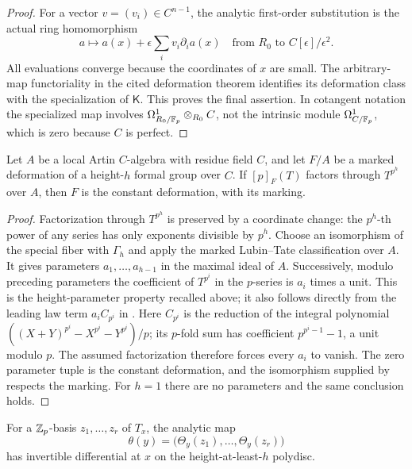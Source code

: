 \begin{proof}
For a vector $v=(v_i)\in C^{n-1}$, the analytic first-order substitution
is the actual ring homomorphism
\[
 a\longmapsto a(x)+\epsilon\sum_i v_i\partial_i a(x)
       \quad\text{from }R_0\text{ to }C[\epsilon]/\epsilon^2.
\]
All evaluations converge because the coordinates of $x$ are small.
The arbitrary-map functoriality in the cited deformation theorem
identifies its deformation class with the specialization of $\mathsf K$.
This proves the final assertion.  In cotangent notation the specialized
map involves $\Omega^1_{R_0/\mathbb F_p}\otimes_{R_0}C$, not the intrinsic module
$\Omega^1_{C/\mathbb F_p}$, which is zero because $C$ is perfect.
\end{proof}

\begin{lemma}\label{def:height-rigidity}
Let $A$ be a local Artin $C$-algebra with residue field $C$, and let $F/A$
be a marked deformation of a height-$h$ formal group over $C$.
If $[p]_F(T)$ factors through $T^{p^h}$ over $A$, then $F$ is the constant
deformation, with its marking.
\end{lemma}

\begin{proof}
Factorization through $T^{p^h}$ is preserved by a coordinate change:
the $p^h$-th power of any series has only exponents divisible by $p^h$.
Choose an isomorphism of the special fiber with $\Gamma_h$ and apply the
marked Lubin--Tate classification over $A$.  It gives parameters
$a_1,\ldots,a_{h-1}$ in the maximal ideal of $A$.
Successively, modulo preceding parameters the coefficient of $T^{p^i}$
in the $p$-series is $a_i$ times a unit.  This is the height-parameter
property recalled above; it also follows directly from the leading law
term $a_i C_{p^i}$ in \cite[Proposition~1.1]{LT66}.  Here $C_{p^i}$ is the
reduction of the integral polynomial
$((X+Y)^{p^i}-X^{p^i}-Y^{p^i})/p$; its $p$-fold sum has coefficient
$p^{p^i-1}-1$, a unit modulo $p$.
The assumed factorization therefore forces every $a_i$ to vanish.
The zero parameter tuple is the constant deformation, and the
isomorphism supplied by \cite[Theorem~3.1]{LT66} respects the marking.
For $h=1$ there are no parameters and the same conclusion holds.
\end{proof}

\begin{proposition}\label{def:coordinates}
For a $\mathbb Z_p$-basis $z_1,\ldots,z_r$ of $T_x$, the analytic map
\begin{equation}
 \theta(y)=\bigl(\Theta_y(z_1),\ldots,\Theta_y(z_r)\bigr)
 \label{def:theta}
\end{equation}
has invertible differential at $x$ on the height-at-least-$h$ polydisc.
\end{proposition}

